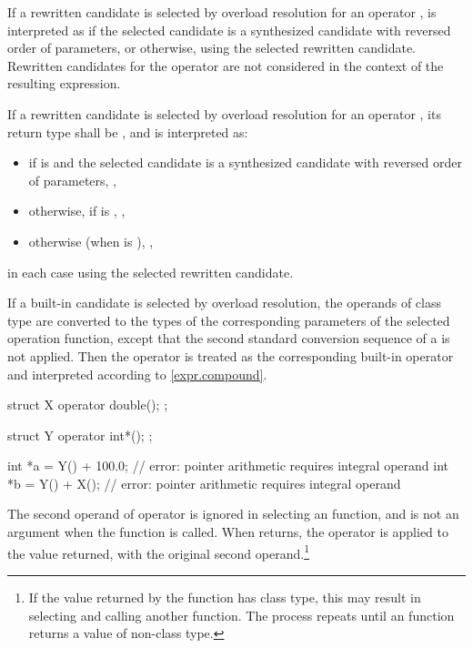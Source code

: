 \pnum
If a rewritten  candidate
is selected by overload resolution
for an operator ,
is interpreted as
if the selected candidate is a synthesized candidate
with reversed order of parameters,
or  otherwise,
using the selected rewritten  candidate.
Rewritten candidates for the operator 
are not considered in the context of the resulting expression.

\pnum
If a rewritten  candidate
is selected by overload resolution
for an operator ,
its return type shall be \cv{} , and
 is interpreted as:
\begin{itemize}
\item
if  is \tcode{!=}
and the selected candidate is a synthesized candidate
with reversed order of parameters,
,
\item
otherwise, if  is \tcode{!=},
,
\item
otherwise (when  is \tcode{==}),
,
\end{itemize}
in each case using the selected rewritten  candidate.

\pnum
If a built-in candidate is selected by overload resolution, the
operands of class type are converted to the types of the corresponding parameters
of the selected operation function, except that the second standard conversion
sequence of a  is not applied.
Then the operator is treated as the corresponding
built-in operator and interpreted according to \ref{expr.compound}.
\begin{example}
\begin{codeblock}
struct X {
  operator double();
};

struct Y {
  operator int*();
};

int *a = Y() + 100.0;           // error: pointer arithmetic requires integral operand
int *b = Y() + X();             // error: pointer arithmetic requires integral operand
\end{codeblock}
\end{example}

\pnum
The second operand of operator
\tcode{->}
is ignored in selecting an
function, and is not an argument when the
function is called.
When
returns, the operator
\tcode{->}
is applied to the value returned, with the original second
operand.\footnote{If the value returned by the
function has class type, this may result in selecting and calling another
function.
The process repeats until an
function returns a value of non-class type.}

